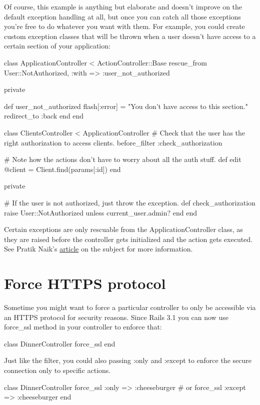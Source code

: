 \documentclass[10pt]{book}
\newenvironment{code}{%
  \scriptsize
    \verbatim
}{%
    \endverbatim
    \newline
}
\begin{document}
Of course, this example is anything but elaborate and doesn’t improve  on the default exception handling at all, but once you can catch all  those exceptions you’re free to do whatever you want with them. For  example, you could create custom exception classes that will be thrown  when a user doesn’t have access to a certain section of your  application:
\begin{code}
class ApplicationController < ActionController::Base
  rescue_from User::NotAuthorized, :with => :user_not_authorized
 
  private
 
  def user_not_authorized
    flash[:error] = "You don't have access to this section."
    redirect_to :back
  end
end
 
class ClientsController < ApplicationController
  # Check that the user has the right authorization to access clients.
  before_filter :check_authorization
 
  # Note how the actions don't have to worry about all the auth stuff.
  def edit
    @client = Client.find(params[:id])
  end
 
  private
 
  # If the user is not authorized, just throw the exception.
  def check_authorization
    raise User::NotAuthorized unless current_user.admin?
  end
end
\end{code}

Certain exceptions are only rescuable from the ApplicationController class, as they are raised before the controller gets initialized and the action gets executed. See Pratik Naik’s \href{http://m.onkey.org/2008/7/20/rescue-from-dispatching}{article} on the subject for more information.

\section{ Force HTTPS protocol}

Sometime you might want to force a particular controller to only be accessible via an HTTPS protocol for security reasons. Since Rails 3.1 you can now use force\_ssl method in your controller to enforce that:
\begin{code}
class DinnerController
  force_ssl
end
\end{code}

Just like the filter, you could also passing :only and :except to enforce the secure connection only to specific actions.
\begin{code}
class DinnerController
  force_ssl :only => :cheeseburger
  # or
  force_ssl :except => :cheeseburger
end
\end{code}
\end{document}
